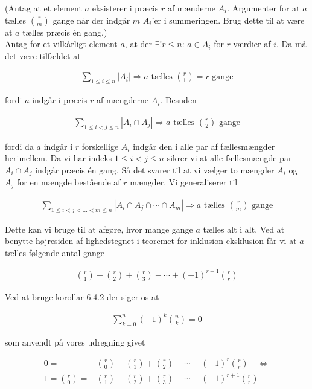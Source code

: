 \documentclass[12pt]{article}
\begin{document}
(Antag at et element $a$ eksisterer i præcis $r$ af mænderne $A_i$. Argumenter for at $a$ tælles $\binom{r}{m}$ gange når der indgår $m$ $A_i$'er i summeringen. Brug dette til at være at $a$ tælles præcis én gang.) \\

Antag for et vilkårligt element $a$, at der  $\exists! r\le n: \, a \in A_i$ for $r$ værdier af $i$. Da må det være tilfældet at 

\begin{align*}
    \sum_{1 \le i \le n} |A_i| \Rightarrow a \text{ tælles } \binom{r}{1} = r \text{ gange}
\end{align*}

fordi $a$ indgår i præcis $r$ af mængderne $A_i$. Desuden

\begin{align*}
    \sum_{1 \le i < j \le n} |A_i \cap A_j| \Rightarrow a \text{ tælles } \binom{r}{2} \text{ gange}
\end{align*}

fordi da $a$ indgår i $r$ forskellige $A_i$ indgår den i alle par af fællesmængder herimellem. Da vi har indeks $1 \le i < j \le n$ sikrer vi at alle fællesmængde-par $A_i \cap A_j$ indgår præcis én gang. Så det svarer til at vi vælger to mængder $A_i$ og $A_j$ for en mængde bestående af $r$ mængder. Vi generaliserer til

\begin{align*}
    \sum_{1 \le i < j < \ldots < m \le n} |A_i \cap A_j \cap \cdots \cap A_m| \Rightarrow a \text{ tælles } \binom{r}{m} \text{ gange}
\end{align*}

Dette kan vi bruge til at afgøre, hvor mange gange $a$ tælles alt i alt. Ved at benytte højresiden af lighedstegnet i teoremet for inklusion-eksklusion får vi at $a$ tælles følgende antal gange

\begin{align*}
    \binom{r}{1} - \binom{r}{2} + \binom{r}{3}- \cdots + (-1)^{r+1} \binom{r}{r} 
\end{align*}

Ved at bruge korollar 6.4.2 der siger os at 

\begin{align*}
    \sum_{k=0}^n (-1)^k \binom{n}{k} = 0
\end{align*}

som anvendt på vores udregning givet

\begin{align}
    0 =& \binom{r}{0} - \binom{r}{1} + \binom{r}{2} - \cdots + (-1)^r \binom{r}{r} \quad \Leftrightarrow \\
    1= \binom{r}{0} =& \binom{r}{1} - \binom{r}{2} + \binom{r}{3} - \cdots + (-1)^{r+1} \binom{r}{r}
\end{align}
\end{document}
